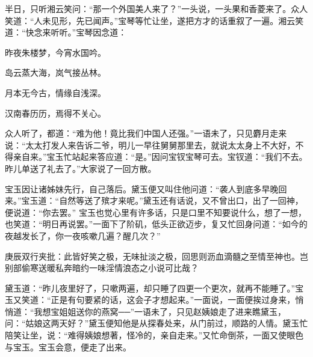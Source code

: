 \begin{parag}


    半日，只听湘云笑问：“那一个外国美人来了？”一头说，一头果和香菱来了。众人笑道：“人未见形，先已闻声。”宝琴等忙让坐，遂把方才的话重叙了一遍。湘云笑道：“快念来听听。”宝琴因念道：
\end{parag}
\begin{poem}

    \begin{pl}

        昨夜朱楼梦，今宵水国吟。
    \end{pl}
    \begin{pl}

        岛云蒸大海，岚气接丛林。
    \end{pl}
    \begin{pl}

        月本无今古，情缘自浅深。
    \end{pl}
    \begin{pl}

        汉南春历历，焉得不关心。
    \end{pl}

\end{poem}
\begin{parag}

    众人听了，都道：“难为他！竟比我们中国人还强。”一语未了，只见麝月走来说：“太太打发人来告诉二爷，明儿一早往舅舅那里去，就说太太身上不大好，不得亲自来。”宝玉忙站起来答应道：“是。”因问宝钗宝琴可去。宝钗道：“我们不去。昨儿单送了礼去了。”大家说了一回方散。
\end{parag}


\begin{parag}


    宝玉因让诸姊妹先行，自己落后。黛玉便又叫住他问道：“袭人到底多早晚回来。”宝玉道：“自然等送了殡才来呢。”黛玉还有话说，又不曾出口，出了一回神，便说道：“你去罢。” 宝玉也觉心里有许多话，只是口里不知要说什么，想了一想，也笑道：“明日再说罢。”一面下了阶矶，低头正欲迈步，复又忙回身问道：“如今的夜越发长了，你一夜咳嗽几遍？醒几次？”\begin{note}庚辰双行夹批：此皆好笑之极，无味扯淡之极，回思则沥血滴髓之至情至神也。岂别部偷寒送暖私奔暗约一味淫情浪态之小说可比哉？\end{note}黛玉道：“昨儿夜里好了，只嗽两遍，却只睡了四更一个更次，就再不能睡了。”宝玉又笑道：“正是有句要紧的话，这会子才想起来。”一面说，一面便挨过身来，悄悄道：“我想宝姐姐送你的燕窝──”一语未了，只见赵姨娘走了进来瞧黛玉，问：“姑娘这两天好？”黛玉便知他是从探春处来，从门前过，顺路的人情。黛玉忙陪笑让坐，说：“难得姨娘想著，怪冷的，亲自走来。”又忙命倒茶，一面又使眼色与宝玉。宝玉会意，便走了出来。
\end{parag}


